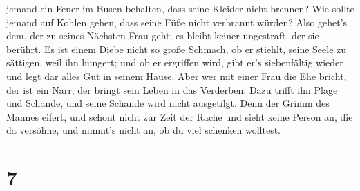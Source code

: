 jemand ein Feuer im Busen behalten, dass seine Kleider nicht brennen?
 Wie sollte jemand auf Kohlen gehen, dass seine Füße
nicht verbrannt würden?  Also gehet's dem, der zu seines
Nächsten Frau geht; es bleibt keiner ungestraft, der sie berührt.
 Es ist einem Diebe nicht so große Schmach, ob er
stiehlt, seine Seele zu sättigen, weil ihn hungert;  und
ob er ergriffen wird, gibt er's siebenfältig wieder und legt dar alles
Gut in seinem Hause.  Aber wer mit einer Frau die Ehe
bricht, der ist ein Narr; der bringt sein Leben in das Verderben.
 Dazu trifft ihn Plage und Schande, und seine Schande
wird nicht ausgetilgt.  Denn der Grimm des Mannes eifert,
und schont nicht zur Zeit der Rache  und sieht keine
Person an, die da versöhne, und nimmt's nicht an, ob du viel schenken
wolltest.

\hypertarget{section-6}{%
\section{7}\label{section-6}}

